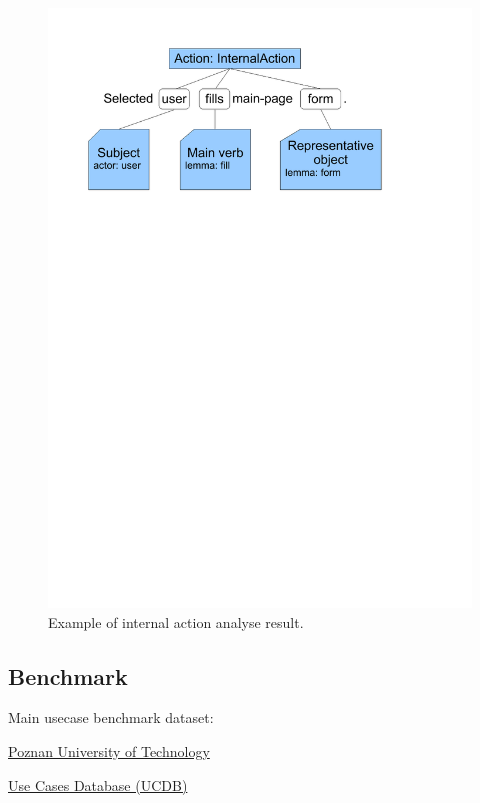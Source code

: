 \begin{figure}[h]
  \centering
  \includegraphics[width=400pt]{images/InternalActionExample}
  \caption{Example of internal action analyse result.}
  \label{fig:InternalActionExample}
\end{figure}


\subsection{Benchmark}
\label{sec:benchmark}

Main usecase benchmark dataset:

\href{http://www2.put.poznan.pl/en}{Poznan University of Technology}

\href{http://www.se.cs.put.poznan.pl/knowledge-base/software-projects-database/use-cases-database-ucdb/use-cases-database-ucdb}{Use Cases Database (UCDB)}

